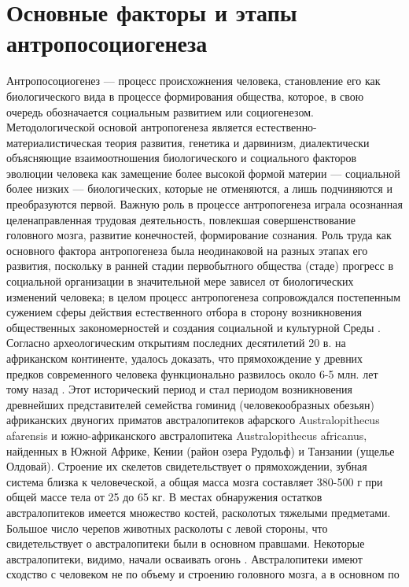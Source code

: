 \documentclass[12pt]{article}
\begin{document}
\section{Основные факторы и этапы антропосоциогенеза}
Антропосоциогенез --- процесс происхожнения человека, становление его как биологического вида в процессе
формирования  общества,  которое,  в  свою  очередь  обозначается  социальным  развитием  или  социогенезом.
Методологической основой антропогенеза является естественно-материалистическая теория развития, генетика
и  дарвинизм,  диалектически  объясняющие  взаимоотношения  биологического  и  социального  факторов
эволюции человека как замещение более высокой формой материи --- социальной более низких --- биологических,
которые не отменяются, а лишь подчиняются и преобразуются первой.
Важную роль в процессе антропогенеза играла осознанная целенаправленная трудовая деятельность, повлекшая
совершенствование головного мозга, развитие конечностей, формирование сознания. Роль труда как основного
фактора  антропогенеза  была  неодинаковой  на  разных  этапах  его  развития,  поскольку  в  ранней  стадии 
первобытного  общества  (стаде)  прогресс  в  социальной  организации  в  значительной  мере  зависел  от
биологических изменений человека; в целом процесс антропогенеза сопровождался постепенным сужением
сферы действия естественного отбора в сторону возникновения общественных закономерностей и создания
социальной и культурной Среды . 
Согласно  археологическим  открытиям  последних  десятилетий  20  в.  на  африканском  континенте,  удалось
доказать, что прямохождение у древних предков современного человека функционально развилось около 6-5
млн. лет тому назад . Этот исторический период и стал периодом возникновения древнейших представителей
семейства гоминид (человекообразных обезьян) африканских двуногих приматов австралопитеков афарского
Australopithecus afarensis и южно-африканского австралопитека Australopithecus africanus, найденных в Южной
Африке, Кении (район озера Рудольф) и Танзании (ущелье Олдовай). Строение их скелетов свидетельствует о
прямохождении, зубная система близка к человеческой, а общая масса мозга составляет 380-500 г при общей
массе  тела  от  25  до  65  кг.  В  местах  обнаружения  остатков  австралопитеков  имеется  множество  костей,
расколотых  тяжелыми  предметами.  Большое  число  черепов  животных  расколоты  с  левой  стороны,  что
свидетельствует о австралопитеки были в основном правшами. Некоторые австралопитеки, видимо, начали
осваивать огонь .
Австралопитеки имеют сходство с человеком не по объему и строению головного мозга, а в основном по
\end{document}
